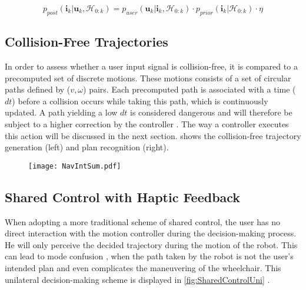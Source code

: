\begin{equation}
p_{post}(\bm{i}_k | \bm{u}_k, \bm{\mathcal{H}}_{0:k}) = p_{user}( \bm{u}_k | \bm{i}_k , \bm{\mathcal{H}}_{0:k}) \cdot p_{prior}(\bm{i}_k | \bm{\mathcal{H}}_{0:k}) \cdot \eta \label{eq:PathProbUser}
\end{equation}

\subsection{Collision-Free Trajectories} \label{sec:ColFreeTraj}
In order to assess whether a user input signal is collision-free, it is compared to a precomputed set of discrete motions. These motions consists of a set of circular paths defined by ($v,\omega$) pairs. Each precomputed path is associated with a time ($dt$) before a collision occurs while taking this path, which is continuously updated. A path yielding a low $dt$ is considered dangerous and will therefore be subject to a higher correction by the controller \cite{DemeesterEtAl2012}. The way a controller executes this action will be discussed in the next section.  shows the collision-free trajectory generation (left) and plan recognition (right).

\begin{figure}[!htbp]
\centering
\texttt{[image: NavIntSum.pdf]}
\label{fig:NavIntSum}
\end{figure}

\newpage

\subsection{Shared Control with Haptic Feedback} \label{sec:SharedControl}
When adopting a more traditional scheme of shared control, the user has no direct interaction with the motion controller during the decision-making process. He will only perceive the decided trajectory during the motion of the robot. This can lead to mode confusion \cite{Lankenau2001}, when the path taken by the robot is not the user’s intended plan and even complicates the maneuvering of the wheelchair. This unilateral decision-making scheme is displayed in \cref{fig:SharedControlUni} \cite{VanderPoortenEtAl2012a}. 

